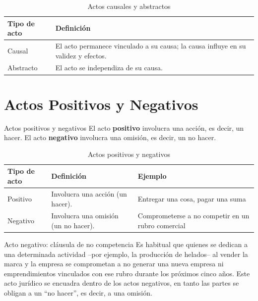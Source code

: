 \documentclass[12pt,oneside]{book}
\begin{document}
\begin{table}[H]
\centering
\begin{tabularx}{\textwidth}{l X}
\toprule
\textbf{Tipo de acto} & \textbf{Definición} \\
\midrule
Causal & El acto permanece vinculado a su causa; la causa influye en su validez y efectos. \\
Abstracto & El acto se independiza de su causa. \\
\bottomrule
\end{tabularx}
\caption{Actos causales y abstractos}
\end{table}


\section{Actos Positivos y Negativos}

\begin{definition}{Actos positivos y negativos}
El acto \textbf{positivo} involucra una acción, es decir, un hacer. El acto \textbf{negativo} involucra una omisión, es decir, un no hacer.
\end{definition}

\begin{table}[H]
\centering
\begin{tabularx}{\textwidth}{l X X}
\toprule
\textbf{Tipo de acto} & \textbf{Definición} & \textbf{Ejemplo} \\
\midrule
Positivo & Involucra una acción (un hacer). & Entregar una cosa, pagar una suma \\
Negativo & Involucra una omisión (un no hacer). & Comprometerse a no competir en un rubro comercial \\
\bottomrule
\end{tabularx}
\caption{Actos positivos y negativos}
\end{table}

\begin{example}{Acto negativo: cláusula de no competencia}
Es habitual que quienes se dedican a una determinada actividad --por ejemplo, la producción de helados-- al vender la marca y la empresa se comprometan a no generar una nueva empresa ni emprendimientos vinculados con ese rubro durante los próximos cinco años. Este acto jurídico se encuadra dentro de los actos negativos, en tanto las partes se obligan a un ``no hacer'', es decir, a una omisión.
\end{example}
\end{document}
